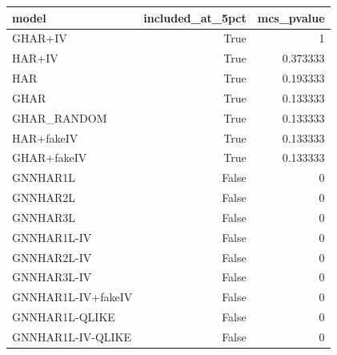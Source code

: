 \begin{tabular}{lrr}
\toprule
model & included_at_5pct & mcs_pvalue \\
\midrule
GHAR+IV & True & 1 \\
HAR+IV & True & 0.373333 \\
HAR & True & 0.193333 \\
GHAR & True & 0.133333 \\
GHAR_RANDOM & True & 0.133333 \\
HAR+fakeIV & True & 0.133333 \\
GHAR+fakeIV & True & 0.133333 \\
GNNHAR1L & False & 0 \\
GNNHAR2L & False & 0 \\
GNNHAR3L & False & 0 \\
GNNHAR1L-IV & False & 0 \\
GNNHAR2L-IV & False & 0 \\
GNNHAR3L-IV & False & 0 \\
GNNHAR1L-IV+fakeIV & False & 0 \\
GNNHAR1L-QLIKE & False & 0 \\
GNNHAR1L-IV-QLIKE & False & 0 \\
\bottomrule
\end{tabular}
